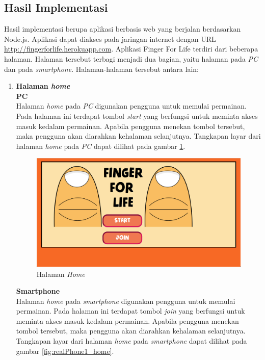 \subsection{Hasil Implementasi}

Hasil implementasi berupa aplikasi berbasis web yang berjalan berdasarkan Node.js. Aplikasi dapat diakses pada jaringan internet dengan URL \url{http://fingerforlife.herokuapp.com}. Aplikasi Finger For Life terdiri dari beberapa halaman. Halaman tersebut terbagi menjadi dua bagian, yaitu halaman pada \textit{PC} dan pada \textit{smartphone}. Halaman-halaman tersebut antara lain:

\begin{enumerate}
	\item \textbf{Halaman \textit{home}} \\
	\textbf{PC} \\
	Halaman \textit{home} pada \textit{PC} digunakan pengguna untuk memulai permainan. Pada halaman ini terdapat tombol \textit{start} yang berfungsi untuk meminta akses masuk kedalam permainan. Apabila pengguna menekan tombol tersebut, maka pengguna akan diarahkan kehalaman selanjutnya. Tangkapan layar dari halaman \textit{home} pada \textit{PC} dapat dilihat pada gambar \ref{fig:realWeb1_home}.
	
\begin{figure}[H]
	\centering
	\includegraphics[scale=0.25]{Gambar/realWeb1_home}
	\caption{Halaman \textit{Home}}
	\label{fig:realWeb1_home}
\end{figure}

	\textbf{Smartphone} \\
	Halaman \textit{home} pada \textit{smartphone} digunakan pengguna untuk memulai permainan. Pada halaman ini terdapat tombol \textit{join} yang berfungsi untuk meminta akses masuk kedalam permainan. Apabila pengguna menekan tombol tersebut, maka pengguna akan diarahkan kehalaman selanjutnya. Tangkapan layar dari halaman \textit{home} pada \textit{smartphone} dapat dilihat pada gambar \ref{fig:realPhone1_home}.
	

\end{enumerate}

